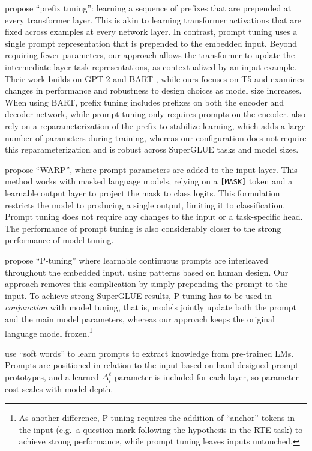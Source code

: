 \documentclass[11pt]{article}
\begin{document}
\citet{li_2021_prefix_tuning} propose ``prefix tuning'': learning a sequence of prefixes that are prepended at every transformer layer. This is akin to learning transformer activations that are fixed across examples at every network layer. In contrast, prompt tuning uses a single prompt representation that is prepended to the embedded input. Beyond requiring fewer parameters, our approach allows the transformer to update the intermediate-layer task representations, as contextualized by an input example. Their work builds on GPT-2 \cite{radford2019language} and BART \cite{lewis-etal-2020-bart}, while ours focuses on T5 and examines changes in performance and robustness to design choices as model size increases. When using BART, prefix tuning includes prefixes on both the encoder and decoder network, while prompt tuning only requires prompts on the encoder. \citet{li_2021_prefix_tuning} also rely on a reparameterization of the prefix to stabilize learning, which adds a large number of parameters during training, whereas our configuration does not require this reparameterization and is robust across SuperGLUE tasks and model sizes.

\citet{hambardzumyan_2021_warp} propose ``WARP'', where prompt parameters are added to the input layer. This method works with masked language models, relying on a {\tt [MASK]} token and a learnable output layer to project the mask to class logits. This formulation restricts the model to producing a single output, limiting it to classification. Prompt tuning does not require any changes to the input or a task-specific head. The performance of prompt tuning is also considerably closer to the strong performance of model tuning.

\citet{liu2021gpt} propose ``P-tuning'' where learnable continuous prompts are interleaved throughout the embedded input, using patterns based on human design. Our approach removes this complication by simply prepending the prompt to the input. To achieve strong SuperGLUE results, P-tuning has to be used in \emph{conjunction} with model tuning, that is, models jointly update both the prompt and the main model parameters, whereas our approach keeps the original language model frozen.\footnote{As another difference, P-tuning requires the addition of ``anchor'' tokens in the input (e.g.\ a question mark following the hypothesis in the RTE task) to achieve strong performance, while prompt tuning leaves inputs untouched.}

\citet{qinLearningHowAsk2021} use ``soft words'' to learn prompts to extract knowledge from pre-trained LMs. Prompts are positioned in relation to the input based on hand-designed prompt prototypes, and a learned $\Delta_i^{\ell}$ parameter is included for each layer, so parameter cost scales with model depth.
\end{document}
